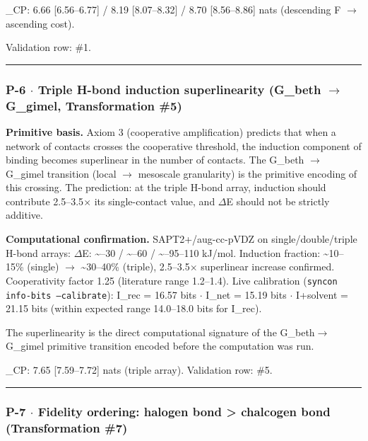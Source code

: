 \documentclass[12pt,a4paper]{article}
\begin{document}
\xi\_CP: 6.66 {[}6.56--6.77{]} / 8.19 {[}8.07--8.32{]} / 8.70 {[}8.56--8.86{]} nats (descending F $\rightarrow$ ascending cost).

Validation row: \#1.

\begin{center}
\rule{0.5\textwidth}{0.4pt}
\end{center}

\subsubsection{P-6 $\cdot$ Triple H-bond induction superlinearity (G\_beth $\rightarrow$ G\_gimel, Transformation \#5)}

\textbf{Primitive basis.} Axiom 3 (cooperative amplification) predicts that when a network of contacts crosses the cooperative threshold, the induction component of binding becomes superlinear in the number of contacts. The G\_beth $\rightarrow$ G\_gimel transition (local $\rightarrow$ mesoscale granularity) is the primitive encoding of this crossing. The prediction: at the triple H-bond array, induction should contribute 2.5--3.5$\times$ its single-contact value, and $\Delta$E should not be strictly additive.

\textbf{Computational confirmation.} SAPT2+/aug-cc-pVDZ on single/double/triple H-bond arrays:
$\Delta$E: \textasciitilde{}--30 / \textasciitilde{}--60 / \textasciitilde{}--95--110 kJ/mol. Induction fraction: \textasciitilde{}10--15\% (single) $\rightarrow$ \textasciitilde{}30--40\% (triple), 2.5--3.5$\times$ superlinear increase confirmed. Cooperativity factor 1.25 (literature range 1.2--1.4). Live calibration (\texttt{syncon info-bits --calibrate}): I\_rec = 16.57 bits $\cdot$ I\_net = 15.19 bits $\cdot$ I+solvent = 21.15 bits (within expected range 14.0--18.0 bits for I\_rec). 

The superlinearity is the direct computational signature of the G\_beth$\rightarrow$G\_gimel primitive transition encoded before the computation was run.

\xi\_CP: 7.65 {[}7.59--7.72{]} nats (triple array). Validation row: \#5.

\begin{center}
\rule{0.5\textwidth}{0.4pt}
\end{center}

\subsubsection{P-7 $\cdot$ Fidelity ordering: halogen bond \textgreater{} chalcogen bond (Transformation \#7)}
\end{document}
